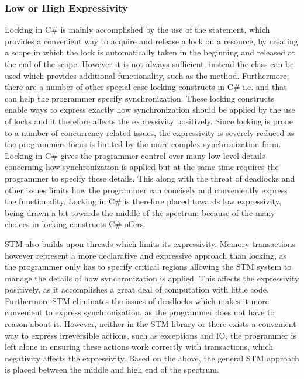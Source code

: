 \subsubsection{Low or High Expressivity}\label{subsec:expressivity}
Locking in C\# is mainly accomplished by the use of the  statement, which provides a convenient way to acquire and release a lock on a resource, by creating a scope in which the lock is automatically taken in the beginning and released at the end of the scope. However it is not always sufficient, instead the  class can be used which provides additional functionality, such as the  method. Furthermore, there are a number of other special case locking constructs in C\#\cite{microsoftSyncPrim} i.e.    and  that can help the programmer specify synchronization. These locking constructs enable ways to express exactly how synchronization should be applied by the use of locks and it therefore affects the expressivity positively. Since locking is prone to a number of concurrency related issues, the expressivity is severely reduced as the programmers focus is limited by the more complex synchronization form. Locking in C\# gives the programmer control over many low level details concerning how synchronization is applied but at the same time requires the programmer to specify these details. This along with the threat of deadlocks and other issues limits how the programmer can concisely and conveniently express the functionality. Locking in C\# is therefore placed towards low expressivity, being drawn a bit towards the middle of the spectrum because of the many choices in locking constructs C\# offers.

\ac{STM} also builds upon threads which limits its expressivity. Memory transactions however represent a more declarative and expressive approach than locking, as the programmer only has to specify critical regions allowing the \ac{STM} system to manage the details of how synchronization is applied. This affects the expressivity positively, as it accomplishes a great deal of computation with little code. Furthermore \ac{STM} eliminates the issues of deadlocks which makes it more convenient to express synchronization, as the programmer does not have to reason about it. However, neither in the \ac{STM} library or \stmname there exists a convenient way to express irreversible actions, such as exceptions and \ac{IO}, the programmer is left alone in ensuring these actions work correctly with transactions, which negativity affects the expressivity. Based on the above, the general \ac{STM} approach is placed between the middle and high end of the spectrum.

